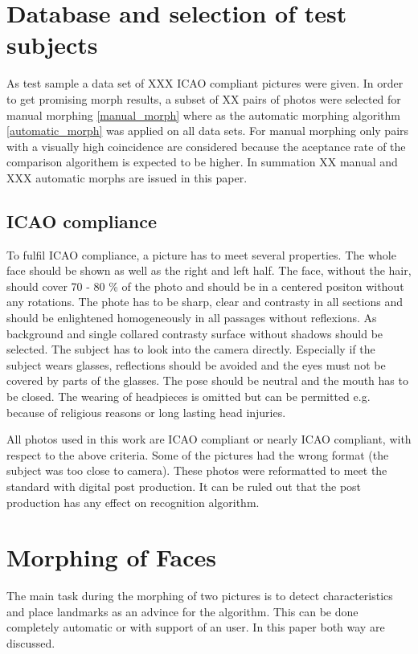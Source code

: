 \section{Database and selection of test subjects}
As test sample a data set of XXX ICAO compliant pictures were given. In order to get promising morph results, a subset of XX  pairs of photos were selected for manual morphing \ref{manual_morph} where as the automatic morphing algorithm \ref{automatic_morph} was applied on all data sets. For manual  morphing only pairs with a visually high coincidence are considered because the aceptance rate of the comparison algorithem is expected to be higher. 
In summation XX manual and XXX automatic morphs are issued in this paper. 

\subsection{ICAO compliance}
To fulfil ICAO compliance, a picture has to meet several properties. The whole face should be shown as well as the right and left half. The face, without the hair, should cover 70 - 80 \% of the photo and should be in a centered positon without any rotations. The phote has to be sharp, clear and contrasty in all sections and should be enlightened homogeneously in all passages without reflexions. As background and single collared contrasty surface without shadows should be selected. The subject has to look into the camera directly. Especially if the subject wears glasses, reflections should be avoided and the eyes must not be covered by parts of the glasses. The pose should be neutral and the mouth has to be closed. The wearing of headpieces is omitted but can be permitted e.g. because of religious reasons or long lasting head injuries\cite{bdi2010Verordnung}. 

All photos used in this work are ICAO compliant or nearly ICAO compliant, with respect to the above criteria. Some of the pictures had the wrong format (the subject was too close to camera). These photos were reformatted to meet the standard with digital post production. It can be ruled out that the post production has any effect on recognition algorithm. 

\section{Morphing of Faces}
The main task during the morphing of two pictures is to detect characteristics and place landmarks as an advince for the algorithm. This can be done completely automatic or with support of an user. In this paper both way are discussed.  
